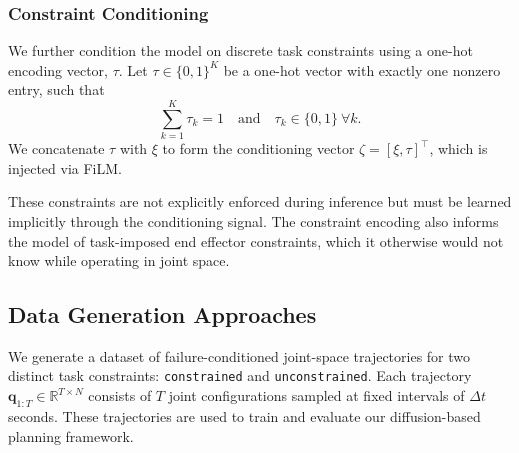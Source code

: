 \subsubsection{Constraint Conditioning}  
We further condition the model on discrete task constraints using a one-hot encoding vector, $\tau$. Let $\tau \in \{0,1\}^K$ be a one-hot vector with exactly one nonzero entry, such that  
\[
\sum_{k=1}^{K} \tau_k = 1 
\quad \text{and} \quad 
\tau_k \in \{0,1\} \ \forall k.
\]  
We concatenate $\tau$ with $\xi$ to form the conditioning vector $\zeta = [\xi, \tau]^\top$, which is injected via FiLM.  

These constraints are not explicitly enforced during inference but must be learned implicitly through the conditioning signal. The constraint encoding also informs the model of task-imposed end effector constraints, which it otherwise would not know while operating in joint space.




\subsection{Data Generation Approaches}
\label{sec:data_generation}


We generate a dataset of failure-conditioned joint-space trajectories for two distinct task constraints: \texttt{constrained} and \texttt{unconstrained}. Each trajectory $\mathbf{q}_{1:T} \in \mathbb{R}^{T \times N}$ consists of $T$ joint configurations sampled at fixed intervals of $\Delta t$ seconds. These trajectories are used to train and evaluate our diffusion-based planning framework.

